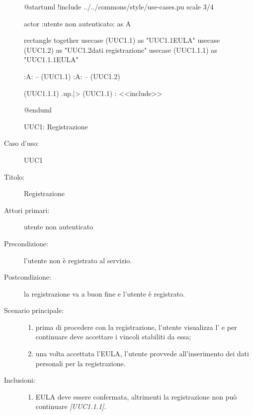 \documentclass[components/casi-duso-app]{subfiles}
\begin{document}
\begin{figure}[h!]
  \centering
  \begin{plantuml}
  @startuml
  !include ../../commons/style/use-cases.pu
  scale 3/4

  actor :utente non autenticato: as A

  rectangle {
    together {
      usecase (UUC1.1) as "UUC1.1\nVisualizzazione EULA"
      usecase (UUC1.2) as "UUC1.2\nInserimento dati registrazione"
      usecase (UUC1.1.1) as "UUC1.1.1\nConferma EULA"
    }
  }

  :A: -- (UUC1.1)
  :A: -- (UUC1.2)

  (UUC1.1.1) .up.|> (UUC1.1) : <<include>>

  @enduml
  \end{plantuml}
  \caption{UUC1: Registrazione}
  \label{fig:uuc1}
\end{figure}

\begin{description}
  \item[Caso d’uso:] UUC1
  \item[Titolo:] Registrazione
  \item[Attori primari:] utente non autenticato
  \item[Precondizione:] l'utente non è registrato al servizio.
  \item[Postcondizione:] la registrazione va a buon fine e l'utente è registrato.
  \item[Scenario principale:]
        \begin{enumerate}
          \item prima di procedere con la registrazione, l'utente visualizza l' e per continuare deve accettare i vincoli stabiliti da essa;
          \item una volta accettata l'EULA, l'utente provvede all'inserimento dei dati personali per la registrazione.
        \end{enumerate}
  \item[Inclusioni:]
        \begin{enumerate}
          \item EULA deve essere confermata, altrimenti la registrazione non può continuare \emph{[UUC1.1.1]}.
        \end{enumerate}
\end{description}
\end{document}
